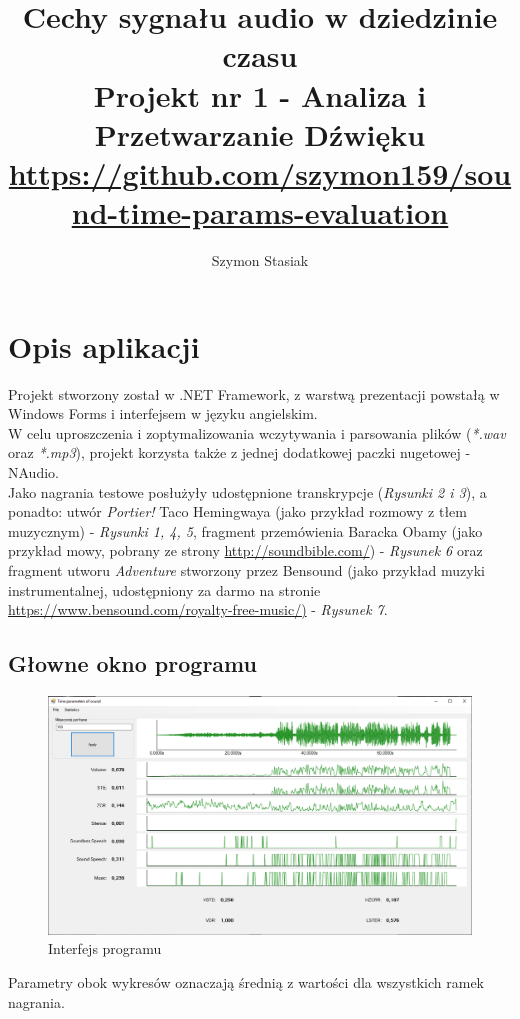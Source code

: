\documentclass[a4paper]{article}
\title{Cechy sygnału audio w dziedzinie czasu\\
\large Projekt nr 1 - Analiza i Przetwarzanie Dźwięku\\ 
\small \url{https://github.com/szymon159/sound-time-params-evaluation}}
\date{}
\author{Szymon Stasiak}
\begin{document}
  \maketitle

\section{Opis aplikacji}
Projekt stworzony został w .NET Framework, z warstwą prezentacji powstałą w Windows Forms i interfejsem w języku angielskim.\\
W celu uproszczenia i zoptymalizowania wczytywania i parsowania plików (\textit{*.wav} oraz \textit{*.mp3}), projekt korzysta także z jednej dodatkowej paczki nugetowej - NAudio.\\
Jako nagrania testowe posłużyły udostępnione transkrypcje (\textit{Rysunki 2 i 3}), a ponadto: utwór \textit{Portier!} Taco Hemingwaya (jako przykład rozmowy z tłem muzycznym) - \textit{Rysunki 1, 4, 5}, fragment przemówienia Baracka Obamy (jako przykład mowy, pobrany ze strony \url{http://soundbible.com/}) - \textit{Rysunek 6} oraz fragment utworu \textit{Adventure} stworzony przez Bensound (jako przykład muzyki instrumentalnej, udostępniony za darmo na stronie \url{https://www.bensound.com/royalty-free-music/)} - \textit{Rysunek 7}.
\subsection{Głowne okno programu}
\begin{figure}[H]
  \includegraphics[width=\linewidth]{images/01interface.png}
  \caption{Interfejs programu}
\end{figure}
Parametry obok wykresów oznaczają średnią z wartości dla wszystkich ramek nagrania.
\end{document}
